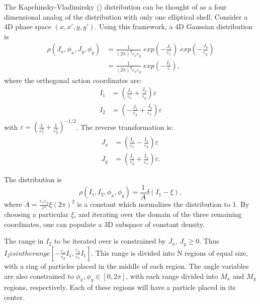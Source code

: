 The Kapchinsky-Vladimirsky () distribution can be thought of as a four dimensional analog of
the  distribution with only one elliptical shell. Consider a 4D phase space $(x,x',
y,y')$.  Using this framework, a 4D Gaussian distribution is
\begin{align}
  \rho(J_x, \phi_x, J_y, \phi_y) &= 
    \frac{1}{(2\pi)^2 \varepsilon_x \varepsilon_y}\; 
    exp(-\frac{J_x}{\varepsilon_x})\; exp(-\frac{J_y} {\varepsilon_y}) \\
  &= \frac{1}{(2\pi)^2 \varepsilon_x \varepsilon_y}\; 
    exp(-\frac{I_1}{\varepsilon}) ,
\end{align}
where the orthogonal action coordinates are:
\begin{align}
  I_1 &= \left(  \frac{J_x}{\varepsilon_x} + \frac{J_y}{\varepsilon_y} \right) \varepsilon \\
  I_2 &= \left( -\frac{J_x}{\varepsilon_y} + \frac{J_y}{\varepsilon_x} \right) \varepsilon
\end{align}
with $\varepsilon = (\frac{1}{\varepsilon_x^2} + \frac{1}{\varepsilon_y^2})^{-1/2}$.  
The reverse transformation is:
\begin{align}
   J_x & = \left( \frac{I_1}{\varepsilon_x} - \frac{I_2}{\varepsilon_y} \right) 
      \varepsilon  \\
   J_y & = \left( \frac{I_1}{\varepsilon_y} + \frac{I_2}{\varepsilon_x} \right) 
      \varepsilon.
\end{align}

The  distribution is
\begin{equation}
  \rho(I_1,I_2,\phi_x,\phi_y) = \frac{1}{A} \delta(I_1 - \xi),
\end{equation}
where $A = \frac{\varepsilon_x \varepsilon_y}{\varepsilon^2} \xi (2\pi)^2$ 
is a constant which normalizes the distribution to 1.  
By choosing a particular $\xi$, and iterating over the domain of the three remaining
coordinates, one can populate a 3D subspace of constant density.

The range in $I_2$ to be iterated over is constrained by $J_x$, $J_y \geq 0$.  
Thus $I_2 is in the range [-\frac{\varepsilon_x}{\varepsilon_y} I_1, 
\frac{\varepsilon_y}{\varepsilon_x} I_1]$. 
This range is divided into N regions of equal size, with a ring of 
particles placed in the middle of each region.  
The angle variables are also constrained to $\phi_x, \phi_y \in [0, 2\pi]$, 
with each range divided into $M_x$ and $M_y$ regions, respectively.  
Each of these regions will have a particle placed in its center.

